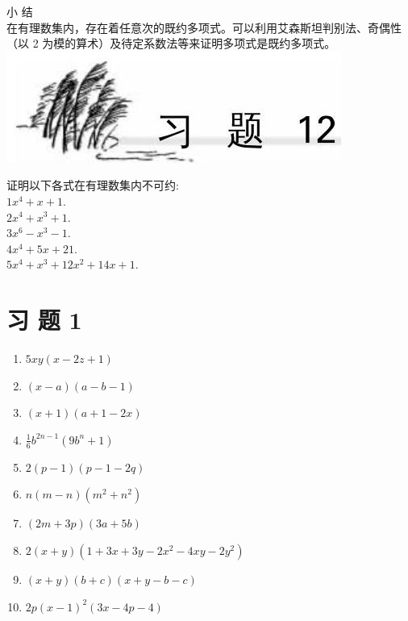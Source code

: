 \documentclass[10pt]{article}
\begin{document}
小 结\\
在有理数集内，存在着任意次的既约多项式。可以利用艾森斯坦判别法、奇偶性（以 2 为模的算术）及待定系数法等来证明多项式是既约多项式。\\
\includegraphics[max width=\textwidth, center]{2024_10_30_bd799899fef40368a068g-097}

证明以下各式在有理数集内不可约:\\
$1 x^{4}+x+1$.\\
$2 x^{4}+x^{3}+1$.\\
$3 x^{6}-x^{3}-1$.\\
$4 x^{4}+5 x+21$.\\
$5 x^{4}+x^{3}+12 x^{2}+14 x+1$.

\section*{习 题 1}
\begin{enumerate}
  \item $5 x y(x-2 z+1)$
  \item $(x-a)(a-b-1)$
  \item $(x+1)(a+1-2 x)$
  \item $\frac{1}{6} b^{2 n-1}\left(9 b^{n}+1\right)$
  \item $2(p-1)(p-1-2 q)$
  \item $n(m-n)\left(m^{2}+n^{2}\right)$
  \item $(2 m+3 p)(3 a+5 b)$
  \item $2(x+y)\left(1+3 x+3 y-2 x^{2}-4 x y-2 y^{2}\right)$
  \item $(x+y)(b+c)(x+y-b-c)$
  \item $2 p(x-1)^{2}(3 x-4 p-4)$
\end{enumerate}
\end{document}
